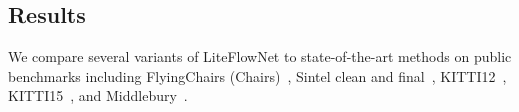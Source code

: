 \documentclass[10pt,twocolumn,letterpaper]{article}
\begin{document}
\subsection{Results} 
\label{sec:results}
%
We compare several variants of LiteFlowNet to state-of-the-art methods on public benchmarks including FlyingChairs (Chairs)~\cite{Fischer15}, Sintel clean and final~\cite{Butler12}, KITTI12~\cite{Geiger12}, KITTI15~\cite{Menze15}, and Middlebury~\cite{Baker11}. 
%
\begin{table}[t]
\small
\centering
\caption{AEE on the Chairs testing set. Models are trained on the Chairs training set.} \label{tab:flyingchairs results}
\end{table}
%
\end{document}
